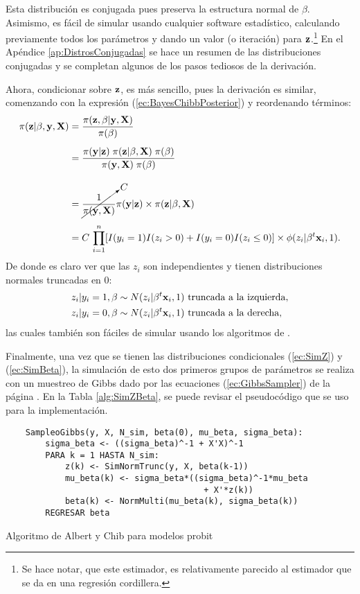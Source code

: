 \documentclass[../Main/Main.tex]{subfiles}
\begin{document}
Esta distribución es conjugada pues preserva la estructura normal de $\beta$. Asimismo, es fácil de simular usando cualquier software estadístico, calculando previamente todos los parámetros y dando un valor (o iteración) para $\mathbf{z}$.\footnote{Se hace notar, que este estimador, es relativamente parecido al estimador que se da en una regresión cordillera.} En el Apéndice \ref{ap:DistrosConjugadas} se hace un resumen de las distribuciones conjugadas y se completan algunos de los pasos tediosos de la derivación. 

Ahora, condicionar sobre $\mathbf{z}$, es más sencillo, pues la derivación es similar, comenzando con la expresión (\ref{ec:BayesChibbPosterior}) y reordenando términos:
\begin{align}
	\pi(\mathbf{z}|\beta,\mathbf{y},\mathbf{X})
	& = \dfrac{\pi(\mathbf{z}, \beta| \mathbf{y}, \mathbf{X})}{\pi(\beta)} \nonumber \\[5pt]
	& = \dfrac{\pi(\mathbf{y} | \mathbf{z})\;\pi(\mathbf{z}|\beta,\mathbf{X}) \; \pi(\beta)}			{\pi(\mathbf{y}, \mathbf{X}) \; \pi(\beta)} \nonumber \\[10pt]
	& = \cancelto{C}{\dfrac{1}{\pi(\mathbf{y}, \mathbf{X})}}\pi(\mathbf{y} | \mathbf{z}) \times \pi(\mathbf{z}|\beta,\mathbf{X}) \nonumber \\[5pt]
	& = C \, \prod_{i = 1}^n[I(y_i = 1)I(z_i > 0) + I(y_i = 0)I(z_i \leq 0)] \times \phi(z_i|\beta^t\mathbf{x}_i,1). \label{ec:BayesChibbZCond}
\end{align}
De donde es claro ver que las $z_i$ son independientes y tienen distribuciones normales truncadas en $0$:
\begin{align}
	z_i|y_i = 1,\beta &\sim N(z_i|\beta^t\mathbf{x}_i,1) \text{ truncada a la izquierda}, \label{ec:SimZ}\\
	z_i|y_i = 0,\beta &\sim N(z_i|\beta^t\mathbf{x}_i,1) \text{ truncada a la derecha}, \nonumber
\end{align}
las cuales también son fáciles de simular usando los algoritmos de \citet{devroye1986non}.

Finalmente, una vez que se tienen las distribuciones condicionales (\ref{ec:SimZ}) y (\ref{ec:SimBeta}), la simulación de esto dos primeros grupos de parámetros se realiza con un muestreo de Gibbs dado por las ecuaciones (\ref{ec:GibbsSampler}) de la página \pageref{ec:GibbsSampler}. En la Tabla \ref{alg:SimZBeta}, se puede revisar el pseudocódigo que se uso para la implementación.\\

\begin{table}[h]
\makebox[\linewidth]{\rule{\textwidth}{0.4pt}}
\begin{verbatim} 
    SampleoGibbs(y, X, N_sim, beta(0), mu_beta, sigma_beta):
        sigma_beta <- ((sigma_beta)^-1 + X'X)^-1
        PARA k = 1 HASTA N_sim:
            z(k) <- SimNormTrunc(y, X, beta(k-1))
            mu_beta(k) <- sigma_beta*((sigma_beta)^-1*mu_beta
            							+ X'*z(k))
            beta(k) <- NormMulti(mu_beta(k), sigma_beta(k)) 
        REGRESAR beta
\end{verbatim}
\makebox[\linewidth]{\rule{\textwidth}{0.4pt}}
\caption{Algoritmo de Albert y Chib para modelos probit}
\label{alg:SimZBeta}
\end{table}
\end{document}
